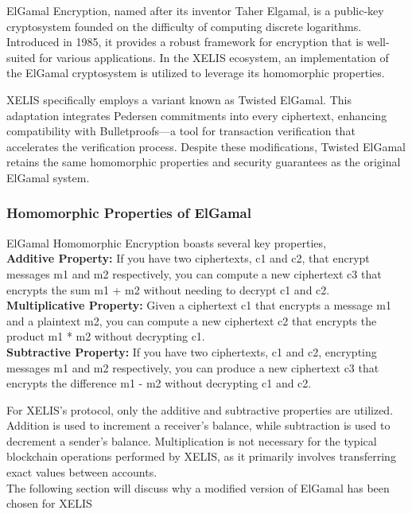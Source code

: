 \documentclass[10pt,a4paper,twocolumn]{article}
\begin{document}
ElGamal Encryption, named after its inventor Taher Elgamal, is a public-key cryptosystem founded on the difficulty of computing discrete logarithms. Introduced in 1985, it provides a robust framework for encryption that is well-suited for various applications. In the XELIS ecosystem, an implementation of the ElGamal cryptosystem is utilized to leverage its homomorphic properties.

XELIS specifically employs a variant known as Twisted ElGamal. This adaptation integrates Pedersen commitments into every ciphertext, enhancing compatibility with Bulletproofs—a tool for transaction verification that accelerates the verification process. Despite these modifications, Twisted ElGamal retains the same homomorphic properties and security guarantees as the original ElGamal system.\\

\subsubsection{Homomorphic Properties of ElGamal}

ElGamal Homomorphic Encryption boasts several key properties,\\

\textbf{Additive Property:} If you have two ciphertexts, c1 and c2, that encrypt messages m1 and m2 respectively, you can compute a new ciphertext c3 that encrypts the sum m1 + m2 without needing to decrypt c1 and c2.\\

\textbf{Multiplicative Property:} Given a ciphertext c1 that encrypts a message m1 and a plaintext m2, you can compute a new ciphertext c2 that encrypts the product m1 * m2 without decrypting c1.\\

\textbf{Subtractive Property:} If you have two ciphertexts, c1 and c2, encrypting messages m1 and m2 respectively, you can produce a new ciphertext c3 that encrypts the difference m1 - m2 without decrypting c1 and c2.

For XELIS's protocol, only the additive and subtractive properties are utilized. Addition is used to increment a receiver's balance, while subtraction is used to decrement a sender's balance. Multiplication is not necessary for the typical blockchain operations performed by XELIS, as it primarily involves transferring exact values between accounts.\\ 

The following section will discuss why a modified version of ElGamal has been chosen for XELIS
\end{document}
